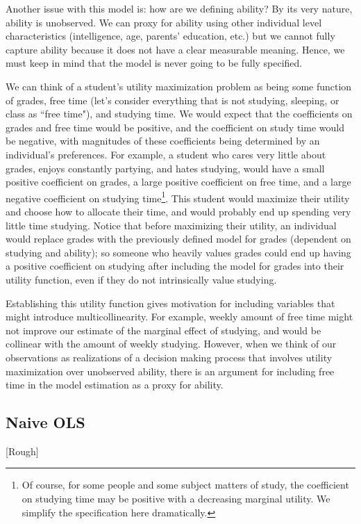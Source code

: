 \documentclass[12pt]{article}
\begin{document}
Another issue with this model is: how are we defining ability? By its very nature, ability is unobserved. We can proxy for ability using other individual level characteristics (intelligence, age, parents' education, etc.) but we cannot fully capture ability because it does not have a clear measurable meaning. Hence, we must keep in mind that the model is never going to be fully specified.

We can think of a student's utility maximization problem as being some function of grades, free time (let's consider everything that is not studying, sleeping, or class as ``free time"), and studying time. We would expect that the coefficients on grades and free time would be positive, and the coefficient on study time would be negative, with magnitudes of these coefficients being determined by an individual's preferences. For example, a student who cares very little about grades, enjoys constantly partying, and hates studying, would have a small positive coefficient on grades, a large positive coefficient on free time, and a large negative coefficient on studying time\footnote{Of course, for some people and some subject matters of study, the coefficient on studying time may be positive with a decreasing marginal utility. We simplify the specification here dramatically.}. This student would maximize their utility and choose how to allocate their time, and would probably end up spending very little time studying. Notice that before maximizing their utility, an individual would replace grades with the previously defined model for grades (dependent on studying and ability); so someone who heavily values grades could end up having a positive coefficient on studying after including the model for grades into their utility function, even if they do not intrinsically value studying.

Establishing this utility function gives motivation for including variables that might introduce multicollinearity. For example, weekly amount of free time might not improve our estimate of the marginal effect of studying, and would be collinear with the amount of weekly studying. However, when we think of our observations as realizations of a decision making process that involves utility maximization over unobserved ability, there is an argument for including free time in the model estimation as a proxy for ability.

\subsection{Naive OLS}
\textcolor{BrickRed}{[Rough]}
\end{document}
